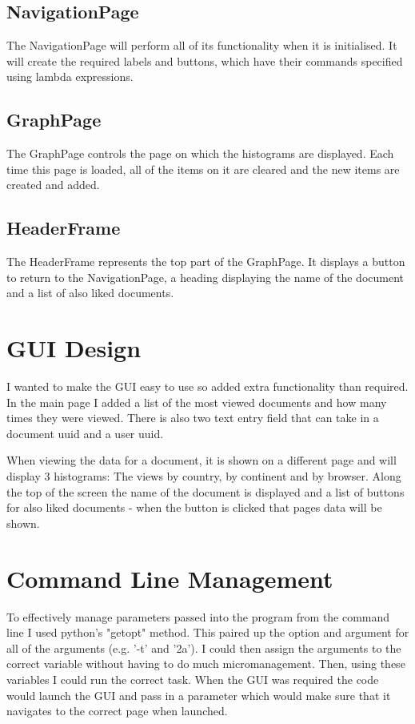 \documentclass[12pt]{report}
\begin{document}
\subsection{NavigationPage}
The NavigationPage will perform all of its functionality when it is initialised.  It will create the required labels and buttons, which have their commands specified using lambda expressions.

\subsection{GraphPage}
The GraphPage controls the page on which the histograms are displayed.  Each time this page is loaded, all of the items on it are cleared and the new items are created and added.

\subsection{HeaderFrame}
The HeaderFrame represents the top part of the GraphPage.  It displays a button to return to the NavigationPage, a heading displaying the name of the document and a list of also liked documents.

\section{GUI Design}
I wanted to make the GUI easy to use so added extra functionality than required.  In the main page I added a list of the most viewed documents and how many times they were viewed.  There is also two text entry field that can take in a document uuid and a user uuid.

When viewing the data for a document, it is shown on a different page and will display 3 histograms: The views by country, by continent and by browser.  Along the top of the screen the name of the document is displayed and a list of buttons for also liked documents - when the button is clicked that pages data will be shown.

\section{Command Line Management}
To effectively manage parameters passed into the program from the command line I used python's "getopt" method.  This paired up the option and argument for all of the arguments (e.g. '-t' and '2a').  I could then assign the arguments to the correct variable without having to do much micromanagement.  Then, using these variables I could run the correct task.  When the GUI was required the code would launch the GUI and pass in a parameter which would make sure that it navigates to the correct page when launched.
\end{document}
